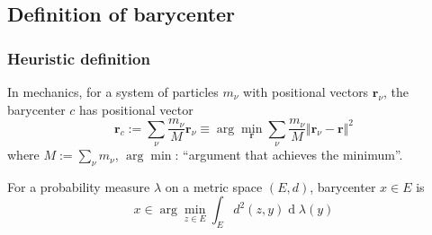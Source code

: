 \documentclass[aspectratio=169]{beamer}
\newcommand{\diff}{\operatorname{d}}
\begin{document}
\subsection{Definition of barycenter}
\begin{frame}
	\frametitle{Heuristic definition}
	In mechanics, for a system of particles $m_\nu$ with positional vectors $\mathbf{r}_\nu$, the barycenter $c$ has positional vector
	\[
		\mathbf{r}_c := \sum_ { \nu } \frac{m_{\nu}}{M} \mathbf { r }_ { \nu } \equiv \arg \min_{\mathbf{r}} \sum_{\nu} \frac{m_\nu}{M} \Vert \mathbf{r}_{\nu} - \mathbf{r}\Vert^2
	\]
	where $ M := \sum _ { \nu } m _ { \nu } $, $\arg \min$: ``argument that achieves the minimum''.
	\pause
	\begin{definition}
		For a probability measure $\lambda$ on a metric space $(E,d)$, barycenter $x \in E$ is
		\[
			x \in \arg\min_{z \in E} \int_{E} d^2(z,y) \diff \lambda(y)
		\]
	\end{definition}


\end{frame}
\end{document}
